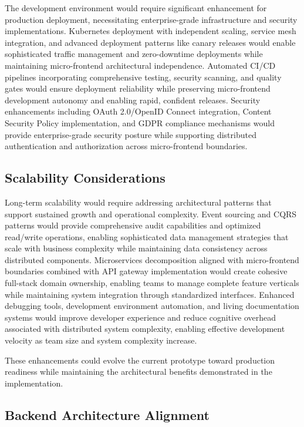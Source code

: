 \documentclass[12pt,a4paper]{report}
\begin{document}
The development environment would require significant enhancement for production deployment, necessitating enterprise-grade infrastructure and security implementations. Kubernetes deployment with independent scaling, service mesh integration, and advanced deployment patterns like canary releases would enable sophisticated traffic management and zero-downtime deployments while maintaining micro-frontend architectural independence. Automated CI/CD pipelines incorporating comprehensive testing, security scanning, and quality gates would ensure deployment reliability while preserving micro-frontend development autonomy and enabling rapid, confident releases. Security enhancements including OAuth 2.0/OpenID Connect integration, Content Security Policy implementation, and GDPR compliance mechanisms would provide enterprise-grade security posture while supporting distributed authentication and authorization across micro-frontend boundaries.

\subsection{Scalability Considerations}

Long-term scalability would require addressing architectural patterns that support sustained growth and operational complexity. Event sourcing and CQRS patterns would provide comprehensive audit capabilities and optimized read/write operations, enabling sophisticated data management strategies that scale with business complexity while maintaining data consistency across distributed components. Microservices decomposition aligned with micro-frontend boundaries combined with API gateway implementation would create cohesive full-stack domain ownership, enabling teams to manage complete feature verticals while maintaining system integration through standardized interfaces. Enhanced debugging tools, development environment automation, and living documentation systems would improve developer experience and reduce cognitive overhead associated with distributed system complexity, enabling effective development velocity as team size and system complexity increase.

These enhancements could evolve the current prototype toward production readiness while maintaining the architectural benefits demonstrated in the implementation.

\subsection{Backend Architecture Alignment}
\end{document}
